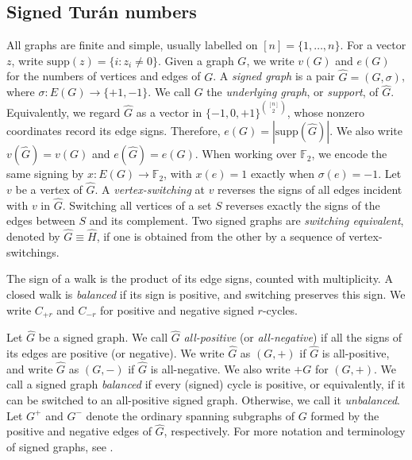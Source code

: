 \documentclass{article}
\newcommand{\supp}{\mathrm{supp}}
\newcommand{\FF}{\mathbb{F}}
\theoremstyle{definition}
\theoremstyle{remark}
\begin{document}
\subsection{Signed Tur\'an numbers}\label{sec:preliminaries}

All graphs are finite and simple, usually labelled on $[n]=\{1,\ldots,n\}$. For a vector $z$, write $\supp(z)=\{i:z_i\ne0\}$. Given a graph $G$,
we write $v(G)$ and $e(G)$ for the numbers of vertices and edges of $G$.
A \emph{signed graph} is a pair
$\widehat G=(G,\sigma)$, where $\sigma:E(G)\to\{+1,-1\}$.  We call $G$ the
\emph{underlying graph}, or \emph{support}, of $\widehat G$.  Equivalently,
we regard $\widehat G$ as a vector in
$\{-1,0,+1\}^{\binom{[n]}2}$, whose nonzero coordinates record its edge
signs. Therefore, $e(G)=|\supp(\widehat G)|$. We also write
$v(\widehat G)=v(G)$ and $e(\widehat G)=e(G)$. When working
over $\FF_2$, we encode the same signing by $x:E(G)\to\FF_2$, with $x(e)=1$
exactly when $\sigma(e)=-1$.  Let $v$ be a vertex of $\widehat G$. A \emph{vertex-switching} at $v$ reverses the
signs of all edges incident with $v$ in $\widehat G$.  Switching all vertices of a set $S$ reverses exactly the signs of the edges between $S$ and its complement. Two signed graphs are \emph{switching equivalent}, denoted by $\widehat G\equiv\widehat H$, if one is obtained from the other by a sequence of vertex-switchings.



The sign of a walk is the product of its edge signs, counted with
multiplicity.  A closed walk is \emph{balanced} if its sign is positive, and
switching preserves this sign.    We write $C_{+r}$ and $C_{-r}$ for positive and negative signed $r$-cycles.

Let $\widehat{G}$ be a signed graph.
We call $\widehat G$ \emph{all-positive} (or \emph{all-negative}) if all the signs of its edges are positive (or negative). We write $\widehat G$ as $(G,+)$ if $\widehat G$ is all-positive, and write $\widehat G$ as  $(G,-)$ if $\widehat G$ is all-negative. We also write $+G$ for $(G,+)$.
 We call a signed graph  \emph{balanced} if every (signed) cycle
is positive, or equivalently, if it can be switched to an all-positive signed
graph. Otherwise, we call it \emph{unbalanced}. Let $G^+$ and $G^-$ denote the ordinary spanning subgraphs of $G$ formed by the positive and negative edges of $\widehat G$, respectively.
For more notation and terminology of signed graphs, see
\cite{Harary53,Zaslavsky82,NaserasrSopenaZaslavsky2021}.
\end{document}

